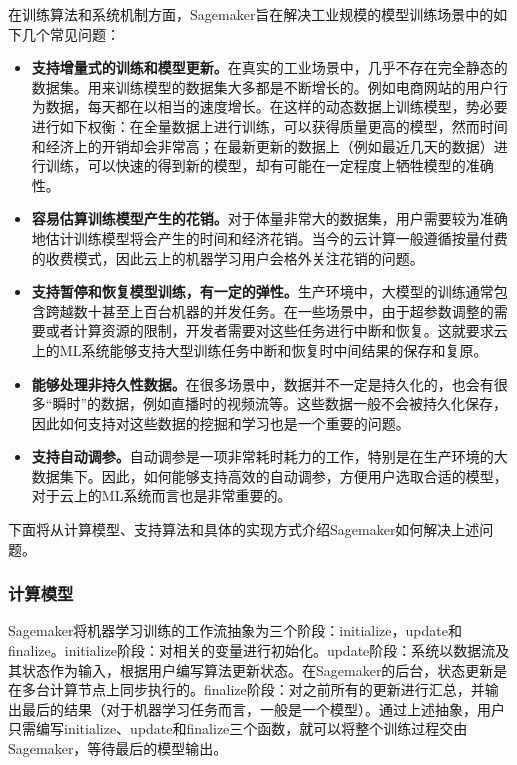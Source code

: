 在训练算法和系统机制方面，Sagemaker旨在解决工业规模的模型训练场景中的如下几个常见问题：

\begin{itemize}
    \item \textbf{支持增量式的训练和模型更新。}在真实的工业场景中，几乎不存在完全静态的数据集。用来训练模型的数据集大多都是不断增长的。例如电商网站的用户行为数据，每天都在以相当的速度增长。在这样的动态数据上训练模型，势必要进行如下权衡：在全量数据上进行训练，可以获得质量更高的模型，然而时间和经济上的开销却会非常高；在最新更新的数据上（例如最近几天的数据）进行训练，可以快速的得到新的模型，却有可能在一定程度上牺牲模型的准确性。
    \item \textbf{容易估算训练模型产生的花销。}对于体量非常大的数据集，用户需要较为准确地估计训练模型将会产生的时间和经济花销。当今的云计算一般遵循按量付费的收费模式，因此云上的机器学习用户会格外关注花销的问题。
    \item \textbf{支持暂停和恢复模型训练，有一定的弹性。}生产环境中，大模型的训练通常包含跨越数十甚至上百台机器的并发任务。在一些场景中，由于超参数调整的需要或者计算资源的限制，开发者需要对这些任务进行中断和恢复。这就要求云上的ML系统能够支持大型训练任务中断和恢复时中间结果的保存和复原。
    \item \textbf{能够处理非持久性数据。}在很多场景中，数据并不一定是持久化的，也会有很多“瞬时”的数据，例如直播时的视频流等。这些数据一般不会被持久化保存，因此如何支持对这些数据的挖掘和学习也是一个重要的问题。
    \item \textbf{支持自动调参。}自动调参是一项非常耗时耗力的工作，特别是在生产环境的大数据集下。因此，如何能够支持高效的自动调参，方便用户选取合适的模型，对于云上的ML系统而言也是非常重要的。
\end{itemize}

下面将从计算模型、支持算法和具体的实现方式介绍Sagemaker如何解决上述问题。

\subsubsection{计算模型}
Sagemaker将机器学习训练的工作流抽象为三个阶段：initialize，update和finalize。initialize阶段：对相关的变量进行初始化。update阶段：系统以数据流及其状态作为输入，根据用户编写算法更新状态。在Sagemaker的后台，状态更新是在多台计算节点上同步执行的。finalize阶段：对之前所有的更新进行汇总，并输出最后的结果（对于机器学习任务而言，一般是一个模型）。通过上述抽象，用户只需编写initialize、update和finalize三个函数，就可以将整个训练过程交由Sagemaker，等待最后的模型输出。

